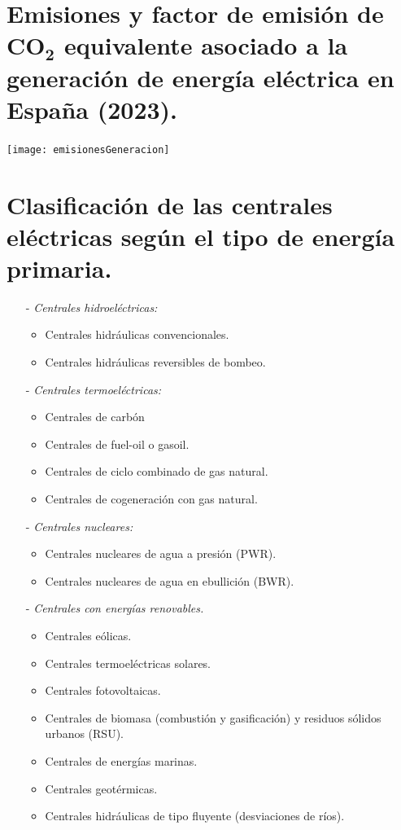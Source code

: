 \section{Emisiones y factor de emisión de $\mathbf{CO_2}$ equivalente asociado a la generación de energía eléctrica en España (2023).}
	\texttt{[image: emisionesGeneracion]}
	
\section{Clasificación de las centrales eléctricas según el tipo de energía primaria.}
	\begin{itemize}
		\item[-] \textit{Centrales hidroeléctricas:}
			\begin{itemize}
				\item Centrales hidráulicas convencionales.
				\item Centrales hidráulicas reversibles de bombeo.
			\end{itemize}
		\item[-] \textit{Centrales termoeléctricas:}
			\begin{itemize}
				\item Centrales de carbón
				\item Centrales de fuel-oil o gasoil.
				\item Centrales de ciclo combinado de gas natural.
				\item Centrales de cogeneración con gas natural.
			\end{itemize}
		\item[-] \textit{Centrales nucleares:}
			\begin{itemize}
				\item Centrales nucleares de agua a presión (PWR).
				\item Centrales nucleares de agua en ebullición (BWR).
			\end{itemize}
		\item[-] \textit{Centrales con energías renovables.}
			\begin{itemize}
				\item Centrales eólicas.
				\item Centrales termoeléctricas solares.
				\item Centrales fotovoltaicas.
				\item Centrales de biomasa (combustión y gasificación) y residuos sólidos urbanos (RSU).
				\item Centrales de energías marinas.
				\item Centrales geotérmicas.
				\item Centrales hidráulicas de tipo fluyente (desviaciones de ríos).
			\end{itemize}
	\end{itemize}
	
